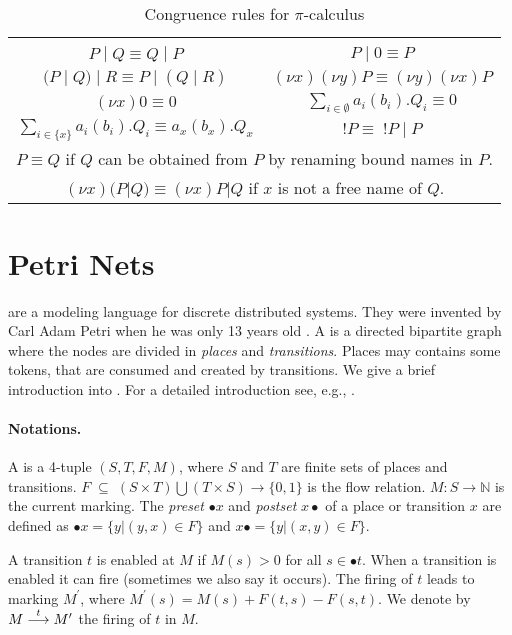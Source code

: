 \documentclass[a4paper]{report}
\numberwithin{algorithm}{chapter}
\begin{document}
\begin{table}
\caption{Congruence rules for $\pi$-calculus}
\label{tblPiCong}
\centering
\begin{tabular}{c c}
 & \\
$P\;|\;Q \equiv Q\;|\;P$ & $P\;|\;0 \equiv P$ \\
$(P\;|\;Q)\;|\;R \equiv P\;|\;(Q\;|\;R) $ & $(\nu x)(\nu y)P \equiv (\nu y)(\nu x)P$ \\
$(\nu x)0 \equiv 0 $ & $\sum_{i \in \emptyset} a_i(b_i).Q_i \equiv 0$ \\
$\sum_{i \in \{x\}} a_i(b_i).Q_i \equiv a_x(b_x).Q_x$ & $!P \equiv \; !P\;|\;P$ \\
\multicolumn{2}{c}{$P \equiv Q$ if $Q$ can be obtained from $P$ by renaming bound names in $P$.}\\
\multicolumn{2}{c}{$(\nu x)(P | Q) \equiv (\nu x)P | Q$ if $x$ is not a free name of $Q$.}
\end{tabular}
\end{table}


\section{Petri Nets}
\pns{} are a modeling language for discrete distributed systems.
They were invented by Carl Adam Petri when he was only 13 years old \cite{pn}.
A \pn{} is a directed bipartite graph where the nodes are divided in \emph{places} and \emph{transitions}.
Places may contains some tokens, that are consumed and created by transitions.
We give a brief introduction into \pns{}.
For a detailed introduction see, e.g., \cite{fcbook,DBLP:journals/eik/EsparzaN94,DBLP:conf/ac/Esparza96}.

\paragraph{Notations.}
A \pn{} is a 4-tuple $(S,T,F,M)$, where $S$ and $T$ are finite sets of places and transitions.
$F \; \subseteq \; (S \times T) \bigcup (T \times S) \rightarrow \{0,1\}$ is the flow relation.
$M: S \rightarrow \mathbb{N}$ is the current marking.
The \emph{preset} $\bullet x$ and \emph{postset} $x \bullet$ of a place or transition $x$ are defined as
$ \bullet x = \{ y | (y,x) \in F\}$ and
$ x \bullet = \{ y | (x,y) \in F\}$.

A transition $t$ is enabled at $M$ if $M(s) > 0$ for all $s \in \bullet t$.
When a transition is enabled it can fire (sometimes we also say it occurs).
The firing of $t$ leads to marking $M^\prime$, where $M^\prime(s) = M(s) + F(t,s) - F(s,t)$.
We denote by $M \buildrel t \over \longrightarrow  M^\prime $ the firing of $t$ in $M$.
\end{document}
